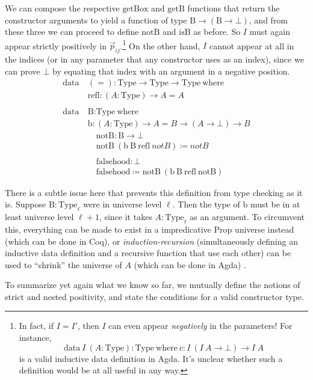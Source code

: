\documentclass{report}
\newcommand{\const}[1]{\text{#1}}
\newcommand{\data}{\const{data}}
\newcommand{\Type}{\const{Type}}
\newcommand{\where}{\const{where}}
\begin{document}
We can compose the respective $\const{getBox}$ and $\const{getB}$ functions that return the constructor arguments to yield a function of type $\const{B} \to (\const{B} \to \bot)$, and from these three we can proceed to define $\const{notB}$ and $\const{isB}$ as before. So $I$ must again appear strictly positively in $\Vec{p}_{ij}$.\footnote{In fact, if $I = I'$, then $I$ can even appear \emph{negatively} in the parameters! For instance, $$\data ~ I ~ (A: \Type) : \Type ~ \where ~ c: I ~ (I ~ A\to \bot) \to I ~ A$$ is a valid inductive data definition in Agda. It's unclear whether such a definition would be at all useful in any way.} On the other hand, $I$ cannot appear at all in the indices (or in any parameter that any constructor uses as an index), since we can prove $\bot$ by equating that index with an argument in a negative position.
%
\begin{align*}
    \data ~ &(=) : \Type \to \Type \to \Type ~ \where \\
    &\const{refl} : (A : \Type) \to A = A \\
    \\
    \data ~ &\const{B} : \Type ~ \where \\
    &\const{b} : (A : \Type) \to A = B \to (A \to \bot) \to B
\end{align*}
\begin{align*}
    &\const{notB} : \const{B} \to \bot \\
    &\const{notB} ~ (\const{b} ~ \const{B} ~ \const{refl} ~ notB) \coloneqq notB \\
    \\
    &\const{falsehood} : \bot \\
    &\const{falsehood} \coloneqq \const{notB} ~ (\const{b} ~ \const{B} ~ \const{refl} ~ \const{notB})
\end{align*}

There is a subtle issue here that prevents this definition from type checking as it is. Suppose $\const{B} : \Type_{\ell}$ were in universe level $\ell$. Then the type of $\const{b}$ must be in at least universe level $\ell + 1$, since it takes $A : \Type_{\ell}$ as an argument. To circumvent this, everything can be made to exist in a impredicative $\const{Prop}$ universe instead (which can be done in Coq), or \emph{induction-recursion} (simultaneously defining an inductive data definition and a recursive function that use each other) can be used to ``shrink'' the universe of $A$ (which can be done in Agda) \citep{nested-pos}.

To summarize yet again what we know so far, we mutually define the notions of strict and nested positivity, and state the conditions for a valid constructor type.
\end{document}
